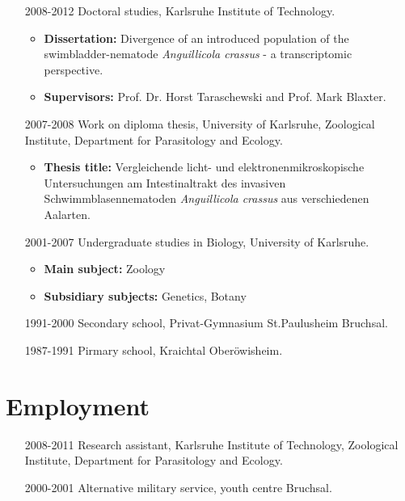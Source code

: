 \begin{itemize}
\item [2008-2012] Doctoral studies, Karlsruhe Institute of Technology.
  \begin{itemize}
  \item \textbf{Dissertation:} Divergence of an introduced population
    of the swimbladder-nematode \textit{Anguillicola crassus} - a
    transcriptomic perspective.
  \item \textbf{Supervisors:}
    Prof. Dr. Horst Taraschewski and Prof. Mark Blaxter.
  \end{itemize}
\item [2007-2008] Work on diploma thesis, University of Karlsruhe,
  Zoological Institute, Department for Parasitology and Ecology.
  \begin{itemize}
  \item \textbf{Thesis title:} Vergleichende licht- und
    elektronenmikroskopische Untersuchungen am Intestinaltrakt des
    invasiven Schwimmblasennematoden \textit{Anguillicola crassus} aus
    verschiedenen Aalarten.
  \end{itemize}
\item [2001-2007] Undergraduate studies in Biology, University of
  Karlsruhe.
  \begin{itemize}
  \item \textbf{Main subject:} Zoology
  \item \textbf{Subsidiary subjects:} Genetics, Botany
  \end{itemize}
\item [1991-2000] Secondary school, Privat-Gymnasium St.Paulusheim
  Bruchsal.
\item [1987-1991] Pirmary school, Kraichtal Ober\"owisheim.
\end{itemize}

\section*{Employment}

\begin{itemize}
\item [2008-2011] Research assistant, Karlsruhe Institute of
  Technology, Zoological Institute, Department for Parasitology and
  Ecology.
\item [2000-2001] Alternative military service, youth centre Bruchsal.
\end{itemize}

%


